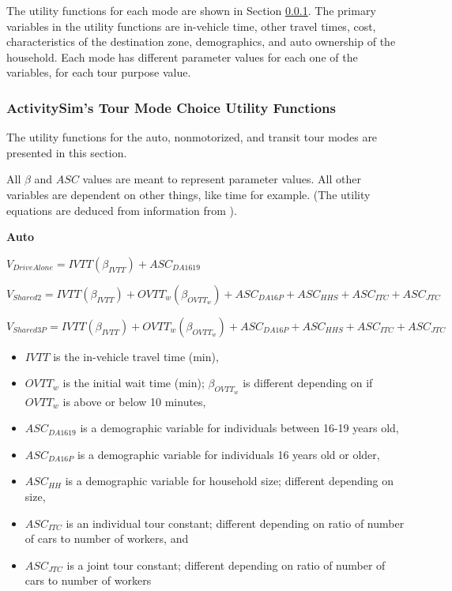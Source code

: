 \documentclass[3p, authoryear, review]{elsarticle} %
\providecommand{\tightlist}{%
  \setlength{\itemsep}{0pt}\setlength{\parskip}{0pt}}
\begin{document}
The utility functions for each mode are shown in Section \ref{lit411}. The primary variables in the utility functions are in-vehicle time, other travel times, cost, characteristics of the destination zone, demographics, and auto ownership of the household. Each mode has different parameter values for each one of the variables, for each tour purpose value.

\hypertarget{lit411}{%
\subsubsection{ActivitySim's Tour Mode Choice Utility Functions}\label{lit411}}

The utility functions for the auto, nonmotorized, and transit tour modes are presented in this section.

All \(\beta\) and \(ASC\) values are meant to represent parameter values. All other variables are dependent on other things, like time for example. (The utility equations are deduced from information from \citet{mtc12}).

\textbf{Auto}

\(V_{DriveAlone} = IVTT(\beta_{IVTT}) + ASC_{DA1619}\)

\(V_{Shared2} = IVTT(\beta_{IVTT}) + OVTT_w(\beta_{OVTT_w}) + ASC_{DA16P} + ASC_{HHS} + ASC_{ITC} + ASC_{JTC}\)

\(V_{Shared3P} = IVTT(\beta_{IVTT}) + OVTT_w(\beta_{OVTT_w}) + ASC_{DA16P} + ASC_{HHS} + ASC_{ITC} + ASC_{JTC}\)

\begin{itemize}
\tightlist
\item
  \(IVTT\) is the in-vehicle travel time (min),
\item
  \(OVTT_w\) is the initial wait time (min); \(\beta_{OVTT_w}\) is different depending on if \(OVTT_w\) is above or below 10 minutes,
\item
  \(ASC_{DA1619}\) is a demographic variable for individuals between 16-19 years old,
\item
  \(ASC_{DA16P}\) is a demographic variable for individuals 16 years old or older,
\item
  \(ASC_{HH}\) is a demographic variable for household size; different depending on size,
\item
  \(ASC_{ITC}\) is an individual tour constant; different depending on ratio of number of cars to number of workers, and
\item
  \(ASC_{JTC}\) is a joint tour constant; different depending on ratio of number of cars to number of workers
\end{itemize}
\end{document}
